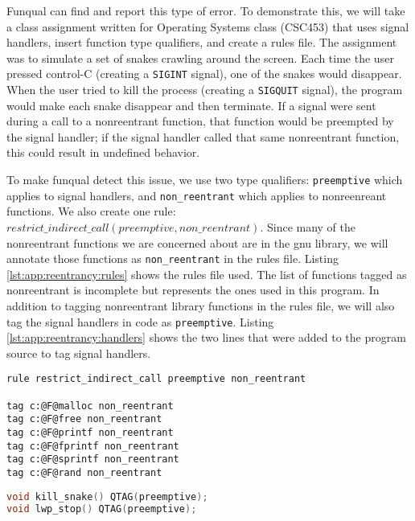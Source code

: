 Funqual can find and report this type of error.  To demonstrate this, we will take a class assignment written for Operating Systems class (CSC453) that uses signal handlers, insert function type qualifiers, and create a rules file.  The assignment was to simulate a set of snakes crawling around the screen.  Each time the user pressed control-C (creating a \lstinline{SIGINT} signal), one of the snakes would disappear.  When the user tried to kill the process (creating a \lstinline{SIGQUIT} signal), the program would make each snake disappear and then terminate.  If a signal were sent during a call to a nonreentrant function, that function would be preempted by the signal handler; if the signal handler called that same nonreentrant function, this could result in undefined behavior.  

To make funqual detect this issue, we use two type qualifiers: \lstinline{preemptive} which applies to signal handlers, and \lstinline{non_reentrant} which applies to nonreenreant functions.  We also create one rule: $restrict\_indirect\_call(preemptive, non\_reentrant)$.  Since many of the nonreentrant functions we are concerned about are in the gnu library, we will annotate those functions as \lstinline{non_reentrant} in the rules file.  Listing \ref{lst:app:reentrancy:rules} shows the rules file used.  The list of functions tagged as nonreentrant is incomplete but represents the ones used in this program.  In addition to tagging nonreentrant library functions in the rules file, we will also tag the signal handlers in code as \lstinline{preemptive}.  Listing \ref{lst:app:reentrancy:handlers} shows the two lines that were added to the program source to tag signal handlers.  

\noindent\begin{minipage}[t]{\linewidth}
\begin{lstlisting}[caption={Rules file for preventing preemptive functions from calling non\_reentrant functions.  Since this rules file contains no references to project-specific functions, the file could concievably be re-used by several projects.},label={lst:app:reentrancy:rules}]
rule restrict_indirect_call preemptive non_reentrant

tag c:@F@malloc non_reentrant
tag c:@F@free non_reentrant
tag c:@F@printf non_reentrant
tag c:@F@fprintf non_reentrant
tag c:@F@sprintf non_reentrant
tag c:@F@rand non_reentrant
\end{lstlisting}
\end{minipage}

\noindent\begin{minipage}[t]{\linewidth}
\begin{lstlisting}[language=c,caption={Lines inserted into C file to mark signal handlers as preemptive.},label={lst:app:reentrancy:handlers}]
void kill_snake() QTAG(preemptive);
void lwp_stop() QTAG(preemptive);
\end{lstlisting}
\end{minipage}


